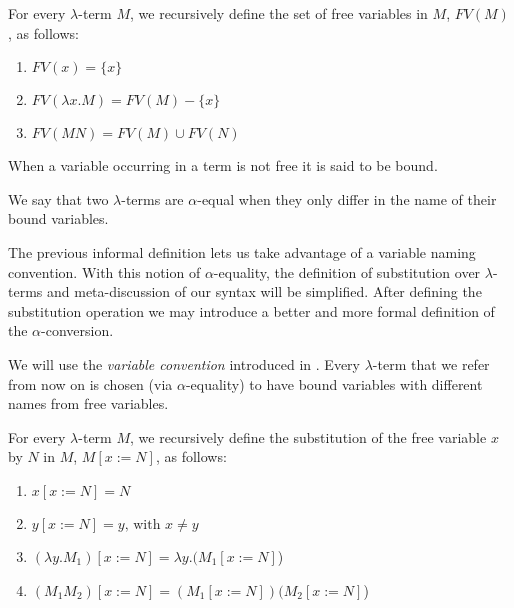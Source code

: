 \begin{definition}
  For every $\lambda$-term $M$, we recursively define the set of free variables in $M$, $FV(M)$, as follows:
  
  \begin{enumerate}
  \item $FV( x ) = \{ x \}$
  \item $FV( \lambda x . M ) = FV(M) - \{ x \}$
  \item $FV( M N ) = FV(M) \cup FV(N)$
  \end{enumerate}

  When a variable occurring in a term is not free it is said to be bound.
\end{definition}


\begin{definition}
  We say that two $\lambda$-terms are $\alpha$-equal when they only differ in the name of their bound variables.
\end{definition}

\begin{remark}
  The previous informal definition lets us take advantage of a variable naming convention.
  With this notion of $\alpha$-equality, the definition of substitution over $\lambda$-terms and meta-discussion of our syntax will be simplified.
  After defining the substitution operation we may introduce a better and more formal definition of the $\alpha$-conversion.
\end{remark}

\begin{convention} 
  We will use the \textit{variable convention} introduced in \cite{Barendregt1987}. Every $\lambda$-term that we refer from now on is chosen (via $\alpha$-equality) to have bound variables with different names from free variables.
\end{convention}

\begin{definition}[Substitution]
  For every $\lambda$-term $M$, we recursively define the substitution of the free variable $x$ by $N$ in $M$, $M[x := N]$, as follows:
  
  \begin{enumerate}
  \item $x[x := N] = N$
  \item $y[x := N] = y \text{, with } x \neq y$
  \item $(\lambda y . M_1)[x := N] = \lambda y . (M_1[x := N]$)
  \item $(M_1 M_2)[x := N] = (M_1[x := N]) (M_2[x := N]$)
  \end{enumerate}
\end{definition}

